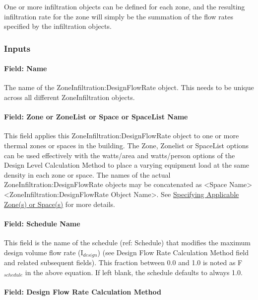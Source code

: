 One or more infiltration objects can be defined for each zone, and the resulting infiltration rate for the zone will simply be the summation of the flow rates specified by the infiltration objects.

\subsubsection{Inputs}\label{inputs-005}

\paragraph{Field: Name}\label{field-name-005}

The name of the ZoneInfiltration:DesignFlowRate object. This needs to be unique across all different ZoneInfiltration objects.

\paragraph{Field: Zone or ZoneList or Space or SpaceList Name}\label{field-zone-or-zonelist-name}

This field applies this ZoneInfiltration:DesignFlowRate object to one or more thermal zones or spaces in the building. The Zone, Zonelist or SpaceList options can be used effectively with the watts/area and watts/person options of the Design Level Calculation Method to place a varying equipment load at the same density in each zone or space. The names of the actual ZoneInfiltration:DesignFlowRate objects may be concatenated as \textless{}Space Name\textgreater{} \textless{}ZoneInfiltration:DesignFlowRate Object Name\textgreater{}. See \hyperref[specifying-applicable-zones-or-spaces]{Specifying Applicable Zone(s) or Space(s)} for more details.

\paragraph{Field: Schedule Name}\label{field-schedule-name-000}

This field is the name of the schedule (ref: Schedule) that modifies the maximum design volume flow rate (I\(_{design}\)) (see Design Flow Rate Calculation Method field and related subsequent fields). This fraction between 0.0 and 1.0 is noted as F\(_{schedule}\) in the above equation. If left blank, the schedule defaults to always 1.0.

\paragraph{Field: Design Flow Rate Calculation Method}\label{field-design-flow-rate-calculation-method}

